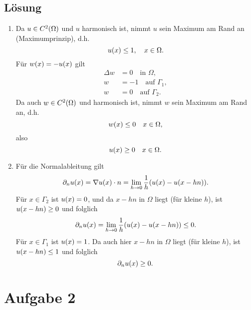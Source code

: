 \documentclass{exercise}
\begin{document}
    \subsection*{Lösung}
    \begin{enumerate}
        \item Da \(u \in C^2\parentheses*{\Omega}\) und \(u\) harmonisch ist, nimmt \(u\) sein Maximum am Rand an (Maximumprinzip), d.h.
        \[
            u\parentheses*{x} \le 1, \quad x \in \Omega.
        \]
        Für \(w\parentheses*{x} = -u\parentheses*{x}\) gilt
        \begin{align*}
            \Delta w &= 0 \quad \text{in }\Omega,\\
            w &= -1 \quad \text{auf }\Gamma_1,\\
            w &= 0 \quad \text{auf }\Gamma_2.
        \end{align*}
        Da auch \(w \in C^2\parentheses*{\Omega}\) und harmonisch ist, nimmt \(w\) sein Maximum am Rand an, d.h.
        \[
            w\parentheses*{x} \le 0 \quad x \in \Omega,
        \]
        also
        \[
            u\parentheses*{x} \ge 0 \quad x \in \Omega.
        \]
        \item Für die Normalableitung gilt
        \[
            \partial_n u\parentheses*{x} = \nabla u\parentheses*{x} \cdot n = \lim_{h \to 0}\frac{1}{h}\parentheses*{u\parentheses*{x} - u\parentheses*{x - hn}}.
        \]
        Für \(x \in \Gamma_2\) ist \(u\parentheses*{x} = 0\), und da \(x - hn\) in \(\Omega\) liegt (für kleine \(h\)), ist \(u\parentheses*{x - hn} \ge 0\) und folglich
        \[
            \partial_n u\parentheses*{x} = \lim_{h \to 0}\frac{1}{h}\parentheses*{u\parentheses*{x} - u\parentheses*{x - hn}} \le 0.
        \]
        Für \(x \in \Gamma_1\) ist \(u\parentheses*{x} = 1\).
        Da auch hier \(x - hn\) in \(\Omega\) liegt (für kleine \(h\)), ist \(u\parentheses*{x - hn} \le 1\) und folglich
        \[
            \partial_n u\parentheses*{x} \ge 0.
        \]
    \end{enumerate}


    \section*{Aufgabe 2}
    
\end{document}
